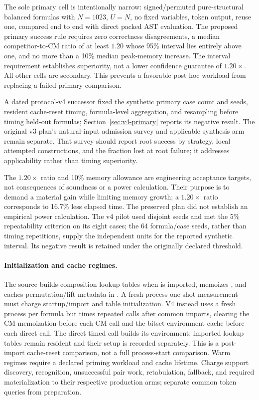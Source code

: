 \documentclass[10pt]{article}
\theoremstyle{plain}
\theoremstyle{definition}
\theoremstyle{remark}
\begin{document}
The sole primary cell is intentionally narrow: signed/permuted pure-structural balanced formulas with $N=1023$, $U=N$, no fixed variables, token output, reuse one, compared end to end with direct packed AST evaluation. The proposed primary success rule requires zero correctness disagreements, a median competitor-to-CM ratio of at least $1.20$ whose 95\% interval lies entirely above one, and no more than a 10\% median peak-memory increase. The interval requirement establishes superiority, not a lower confidence guarantee of $1.20\times$. All other cells are secondary. This prevents a favorable post hoc workload from replacing a failed primary comparison.

A dated protocol-v4 successor fixed the synthetic primary case count and seeds, resident cache-reset timing, formula-level aggregation, and resampling before timing held-out formulas; Section~\ref{sec:v4-primary} reports its negative result. The original v3 plan's natural-input admission survey and applicable synthesis arm remain separate. That survey should report root success by strategy, local attempted constructions, and the fraction lost at root failure; it addresses applicability rather than timing superiority.

The $1.20\times$ ratio and 10\% memory allowance are engineering acceptance targets, not consequences of soundness or a power calculation. Their purpose is to demand a material gain while limiting memory growth; a $1.20\times$ ratio corresponds to 16.7\% less elapsed time. The preserved plan did not establish an empirical power calculation. The v4 pilot used disjoint seeds and met the 5\% repeatability criterion on its eight cases; the 64 formula/case seeds, rather than timing repetitions, supply the independent units for the reported synthetic interval. Its negative result is retained under the originally declared threshold.

\paragraph{Initialization and cache regimes.}
The source builds composition lookup tables when  is imported, memoizes , and caches permutation/lift metadata in . A fresh-process one-shot measurement must charge startup/import and table initialization. V4 instead uses a fresh process per formula but times repeated calls after common imports, clearing the CM memoization before each CM call and the bitset-environment cache before each direct call. The direct timed call builds its environment; imported lookup tables remain resident and their setup is recorded separately. This is a post-import cache-reset comparison, not a full process-start comparison. Warm regimes require a declared priming workload and cache lifetime. Charge support discovery, recognition, unsuccessful pair work, retabulation, fallback, and required materialization to their respective production arms; separate common token queries from preparation.
\end{document}
